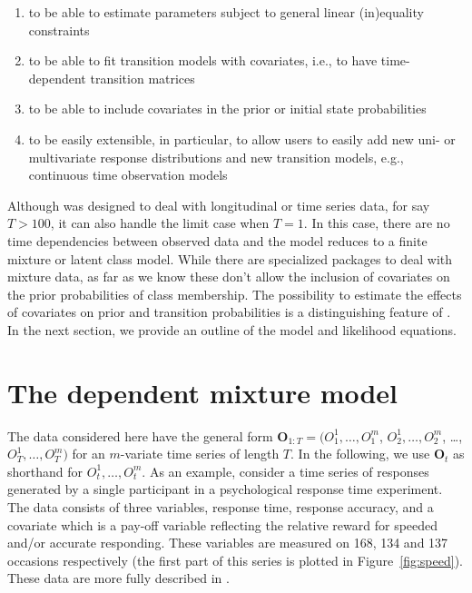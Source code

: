 \documentclass[article]{jss}
\newcommand{\vc}{\mathbf}
\begin{document}
\begin{enumerate}
	
	\item to be able to estimate parameters subject to general
	linear (in)equality constraints
	
	\item to be able to fit transition models with covariates, i.e.,
	to have time-dependent transition matrices
	
	\item to be able to include covariates in the prior or initial
	state probabilities
	
	\item to be easily extensible, in particular, to allow users to
	easily add new uni- or multivariate response distributions and
	new transition models, e.g., continuous time observation models
	
\end{enumerate}

Although  was designed to deal with longitudinal or time
series data, for say $T>100$, it can also handle the limit case when
$T=1$.  In this case, there are no time dependencies between observed
data and the model reduces to a finite mixture or latent class model.
While there are specialized packages to deal with mixture data, as far
as we know these don't allow the inclusion of covariates on the prior
probabilities of class membership.  The possibility to estimate the
effects of covariates on prior and transition probabilities is a
distinguishing feature of .  In the next section, we
provide an outline of the model and likelihood equations.


\section{The dependent mixture model}

The data considered here have the general form $\vc{O}_{1:T}=
(O_{1}^{1}, \ldots, O_{1}^{m}$, $O_{2}^{1}, \ldots, O_{2}^{m}$,
\ldots, $O_{T}^{1}, \ldots, O_{T}^{m})$ for an $m$-variate time series
of length $T$.  In the following, we use $\vc{O}_{t}$ as shorthand for
$O_{t}^{1}, \ldots, O_{t}^{m}$. As an example, consider a time series of responses
generated by a single participant in a psychological response time
experiment.  The data consists of three variables, response time,
response accuracy, and a covariate which is a pay-off variable
reflecting the relative reward for speeded and/or accurate responding.
These variables are measured on 168, 134 and 137 occasions
respectively (the first part of this series is plotted in
Figure~\ref{fig:speed}).  These data are more fully described in
\citet{Dutilh2009}.
\end{document}
